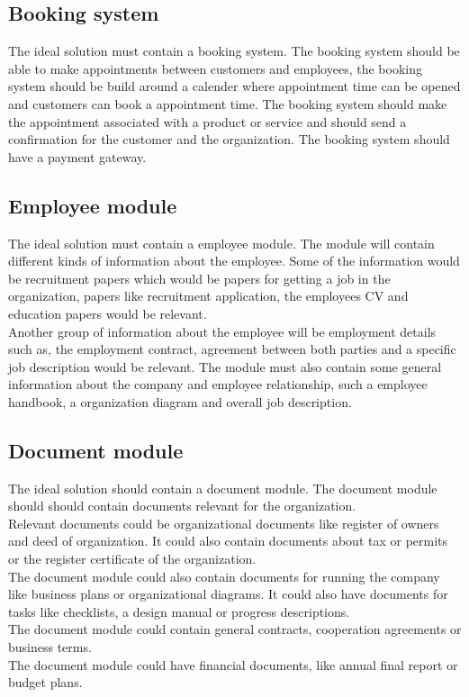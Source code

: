 \subsection{Booking system}

The ideal solution must contain a booking system. The booking system should be able to make appointments between customers and employees, the booking system should be build around a calender where appointment time can be opened and customers can book a appointment time. The booking system should make the appointment associated with a product or service and should send a confirmation for the customer and the organization. The booking system should have a payment gateway.

\subsection{Employee module}
The ideal solution must contain a employee module. The module will contain different kinds of information about the employee. Some of the information would be recruitment papers which would be papers for getting a job in the organization, papers like recruitment application, the employees CV and education papers would be relevant. \\
Another group of information about the employee will be employment details such as, the employment contract, agreement between both parties and a specific job description would be relevant. The module must also contain some general information about the company and employee relationship, such a employee handbook, a organization diagram and overall job description.

\subsection{Document module}
The ideal solution should contain a document module. The document module should should contain documents relevant for the organization.\\
Relevant documents could be organizational documents like register of owners and deed of organization. It could also contain documents about tax or permits or the register certificate of the organization.\\
The document module could also contain documents for running the company like business plans or organizational diagrams. It could also have documents for tasks like checklists, a design manual or progress descriptions.\\
The document module could contain general contracts, cooperation agreements or business terms.\\
The document module could have financial documents, like annual final report or budget plans.

